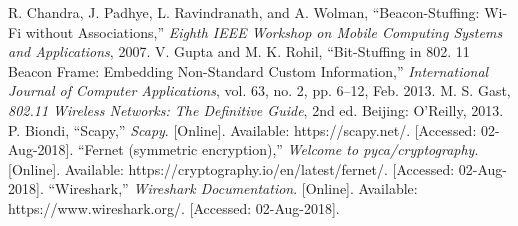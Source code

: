 \documentclass[letterpaper, 10 pt, conference]{ieeeconf}  %
\begin{document}
\begin{thebibliography}{99}

 R. Chandra, J. Padhye, L. Ravindranath, and A. Wolman, “Beacon-Stuffing: Wi-Fi without Associations,” \textit{Eighth IEEE Workshop on Mobile Computing Systems and Applications}, 2007.
 V. Gupta and M. K. Rohil, “Bit-Stuffing in 802. 11 Beacon Frame: Embedding Non-Standard Custom Information,” \textit{International Journal of Computer Applications}, vol. 63, no. 2, pp. 6–12, Feb. 2013.
 M. S. Gast, \textit{802.11 Wireless Networks: The Definitive Guide}, 2nd ed. Beijing: O'Reilly, 2013.
 P. Biondi, “Scapy,” \textit{Scapy}. [Online]. Available: https://scapy.net/. [Accessed: 02-Aug-2018].
 “Fernet (symmetric encryption),” \textit{Welcome to pyca/cryptography}. [Online]. Available: https://cryptography.io/en/latest/fernet/. [Accessed: 02-Aug-2018].
 “Wireshark,” \textit{Wireshark Documentation}. [Online]. Available: https://www.wireshark.org/. [Accessed: 02-Aug-2018].

\end{thebibliography}



\end{document}
